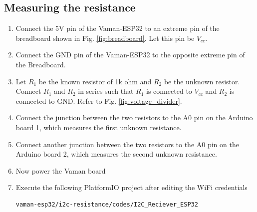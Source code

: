 \subsection{Measuring the resistance}
\begin{enumerate}[label=\thesection.\arabic*.,ref=\thesection.\theenumi]

\item
Connect the 5V pin of the Vaman-ESP32 to an extreme pin of the breadboard shown 
in Fig. \ref{fig:breadboard}.  Let this pin be $V_{cc}$.
\item
Connect the GND pin of the Vaman-ESP32 to the opposite extreme pin of the 
Breadboard.
\item
Let $R_1$ be the known resistor of 1k ohm and $R_2$ be the unknown resistor. 
Connect $R_1$ and $R_2$ in series such that $R_1$ is connected to $V_{cc}$ and 
$R_2$ is connected to GND. Refer to Fig. \ref{fig:voltage_divider}.
\item
Connect the junction between the two resistors to the A0 pin on the Arduino 
board 1, which measures the first unknown resistance.
\item 
Connect another junction between the two resistors to the A0 pin on the Arduino 
board 2, which measures the second unknown resistance.
\item
Now power the Vaman board
\item
Execute the following PlatformIO project after editing the WiFi credentials
\begin{lstlisting}
vaman-esp32/i2c-resistance/codes/I2C_Reciever_ESP32
\end{lstlisting}
\end{enumerate}
